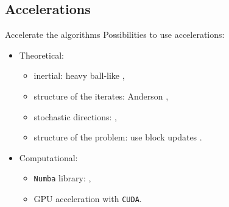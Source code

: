 \documentclass[10pt,aspectratio=43]{beamer}
\begin{document}
\subsection{Accelerations}
\begin{frame}{Accelerate the algorithms}
Possibilities to use accelerations:
\begin{itemize}
    \setlength\itemsep{1em}
    \item Theoretical:
    \begin{itemize}
        \item inertial: heavy ball-like ,
        \item structure of the iterates: Anderson ,
        \item stochastic directions: ,
        \item structure of the problem: use block updates .
    \end{itemize}
    \item Computational:
    \begin{itemize}
        \item \texttt{Numba} library: ,
        \item GPU acceleration with \texttt{CUDA}.
    \end{itemize}
\end{itemize}
\end{frame}



\end{document}

